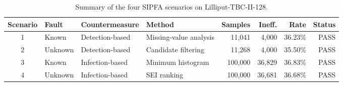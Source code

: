 \begin{table}[t]
\centering
\caption{Summary of the four SIPFA scenarios on Lilliput-TBC-II-128.}
\label{tab:scenario-summary}
\small
\begin{tabular}{clllrrrr}
\toprule
Scenario & Fault & Countermeasure & Method & Samples & Ineff. & Rate & Status \\
\midrule
1 & Known & Detection-based & Missing-value analysis & 11,041 & 4,000 & 36.23\% & PASS \\
2 & Unknown & Detection-based & Candidate filtering & 11,268 & 4,000 & 35.50\% & PASS \\
3 & Known & Infection-based & Minimum histogram & 100,000 & 36,829 & 36.83\% & PASS \\
4 & Unknown & Infection-based & SEI ranking & 100,000 & 36,681 & 36.68\% & PASS \\
\bottomrule
\end{tabular}
\end{table}

